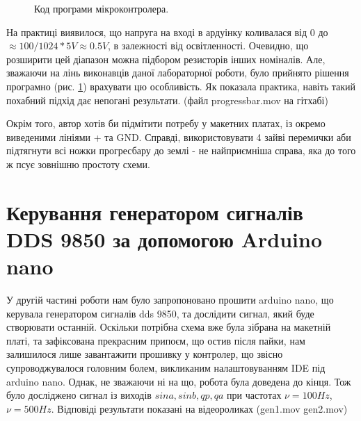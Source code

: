 \begin{figure}[h]
\caption{Код програми мікроконтролера.}
\label{fig:code1}
\end{figure}

На практиці виявилося, що напруга на вході в ардуінку коливалася від $0$ до $\approx 100/1024 * 5 V \approx 0.5 V$, в залежності від освітленності. Очевидно, що розширити цей діапазон можна підбором резисторів інших номіналів. Але, зважаючи на лінь виконавців даної лабораторної роботи, було прийнято рішення програмно (рис. \ref{fig:code1}) врахувати цю особливість. Як показала практика, навіть такий похабний підхід дає непогані результати. (файл progressbar.mov на гітхабі)

Окрім того, автор хотів би підмітити потребу у макетних платах, із окремо виведеними лініями + та GND. Справді, використовувати 4 зайві перемички аби підтягнути всі ножки прогресбару до землі - не найприємніша справа, яка до того ж псує зовнішню простоту схеми.

\section{Керування генератором сигналів DDS 9850 за допомогою Arduino nano}

У другій частині роботи нам було запропоновано прошити arduino nano, що керувала генератором сигналів dds 9850, та дослідити сигнал, який буде створювати останній. Оскільки потрібна схема вже була зібрана на макетній платі, та зафіксована прекрасним припоєм, що остив після пайки, нам залишилося лише завантажити прошивку у контролер, що звісно супроводжувалося головним болем, викликаним налаштовуванням IDE під arduino nano. Однак, не зважаючи ні на що, робота була доведена до кінця. Тож було досліджено сигнал із виходів $sina,sinb,qp,qa$ при частотах $\nu = 100 Hz$, $\nu = 500 Hz$. Відповіді результати показані на відеороликах (gen1.mov gen2.mov)